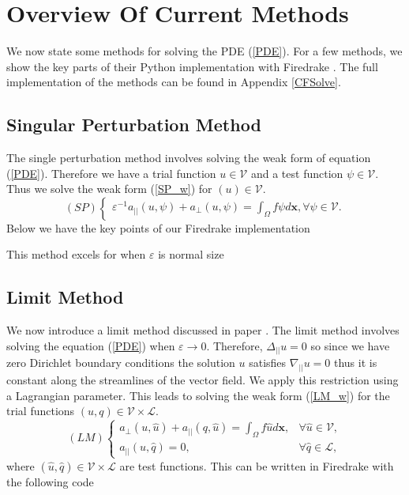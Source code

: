 \documentclass[12pt]{ociamthesis}
\begin{document}
\section{Overview Of Current Methods}
 We now state some methods for solving the PDE (\ref{PDE}). For a few methods, we show the key parts of their Python implementation with Firedrake \cite{Dragon}. The full implementation of the methods can be found in Appendix \ref{CFSolve}.
\subsection{Singular Perturbation Method} \label{SP}
The single perturbation method involves solving the weak form of equation (\ref{PDE}). Therefore we have a trial function $u \in \mathcal{V}$ and a test function $\psi \in \mathcal{V}$. Thus we solve the weak form (\ref{SP_w}) for $(u) \in \mathcal{V}$.
\begin{equation} \label{SP_w}
(SP)
\begin{cases}
\varepsilon^{-1}a_{||}(u, \psi) + a_{\perp}(u, \psi) = \int_{\Omega} f \psi d\mathbf{x}, \forall \psi \in \mathcal{V}.
\end{cases}
\end{equation}
Below we have the key points of our Firedrake \cite{Dragon} implementation

This method excels for when $\varepsilon$ is normal size

\subsection{Limit Method} \label{LM}
We now introduce a limit method discussed in paper \cite{AP}. The limit method involves solving the equation (\ref{PDE}) when $\varepsilon \rightarrow 0$. Therefore, $\Delta_{||}u=0$ so since we have zero Dirichlet boundary conditions the solution $u$ satisfies $\nabla_{||}u=0$ thus it is constant along the streamlines of the vector field. We apply this restriction using a Lagrangian parameter. This leads to solving the weak form (\ref{LM_w}) for the trial functions $(u, q) \in \mathcal{V} \times \mathcal{L}$.
\begin{equation} \label{LM_w}
(LM)
\begin{cases}
a_{\perp}(u, \hat{u}) + a_{||}(q, \hat{u}) = \int_{\Omega} f \hat{u} d\mathbf{x}, 
&\forall \hat{u} \in \mathcal{V},\\
a_{||}(u, \hat{q}) = 0, & \forall \hat{q} \in \mathcal{L},
\end{cases}
\end{equation}
where $(\hat{u}, \hat{q}) \in \mathcal{V} \times \mathcal{L}$ are test functions. This can be written in Firedrake with the following code

\end{document}
